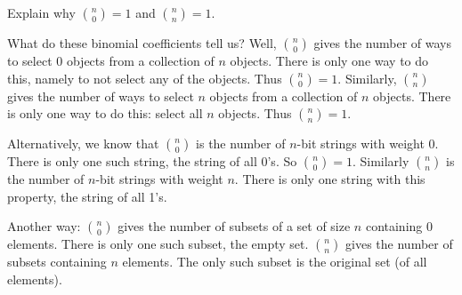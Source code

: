 \documentclass[12pt]{article}
\begin{document}
\begin{example}
  Explain why ${n \choose 0} = 1$ and ${n \choose n} = 1$.
  \begin{solution}
    What do these binomial coefficients tell us? Well, ${n \choose 0}$ gives the number of ways to select 0 objects from a collection of $n$ objects.  There is only one way to do this, namely to not select any of the objects.  Thus ${n \choose 0} = 1$.  Similarly, ${n \choose n}$ gives the number of ways to select $n$ objects from a collection of $n$ objects.  There is only one way to do this: select all $n$ objects.  Thus ${n \choose n} = 1$.

    Alternatively, we know that ${n \choose 0}$ is the number of $n$-bit strings with weight 0.  There is only one such string, the string of all 0's.  So ${n \choose 0} = 1$.  Similarly ${n \choose n}$ is the number of $n$-bit strings with weight $n$.  There is only one string with this property, the string of all 1's.

    Another way: ${n \choose 0}$ gives the number of subsets of a set of size $n$ containing 0 elements.  There is only one such subset, the empty set.  ${n \choose n}$ gives the number of subsets containing $n$ elements.  The only such subset is the original set (of all elements).
  \end{solution}

\end{example}
\end{document}
